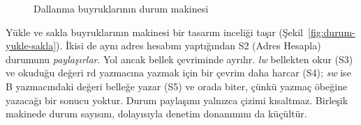 \begin{figure}[htbp]
\centering
{}
\caption{Dallanma buyruklarının durum makinesi}
\label{fig:durum-beq}
\end{figure}

Yükle ve sakla buyruklarının makinesi bir tasarım inceliği taşır (Şekil~\ref{fig:durum-yukle-sakla}). İkisi de aynı adres hesabını yaptığından S2 (Adres Hesapla) durumunu \emph{paylaşırlar}. Yol ancak bellek çevriminde ayrılır. \emph{lw} bellekten okur (S3) ve okuduğu değeri rd yazmacına yazmak için bir çevrim daha harcar (S4); \emph{sw} ise B yazmacındaki değeri belleğe yazar (S5) ve orada biter, çünkü yazmaç öbeğine yazacağı bir sonucu yoktur. Durum paylaşımı yalnızca çizimi kısaltmaz. Birleşik makinede durum sayısını, dolayısıyla denetim donanımını da küçültür.

